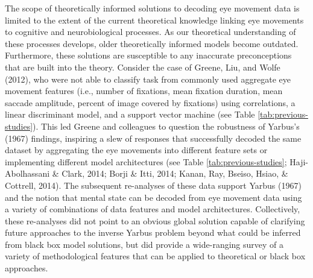 \documentclass[
  english,
  man, donotrepeattitle,floatsintext]{apa6}
\begin{document}
The scope of theoretically informed solutions to decoding eye movement data is limited to the extent of the current theoretical knowledge linking eye movements to cognitive and neurobiological processes. As our theoretical understanding of these processes develops, older theoretically informed models become outdated. Furthermore, these solutions are susceptible to any inaccurate preconceptions that are built into the theory. Consider the case of Greene, Liu, and Wolfe (2012), who were not able to classify task from commonly used aggregate eye movement features (i.e., number of fixations, mean fixation duration, mean saccade amplitude, percent of image covered by fixations) using correlations, a linear discriminant model, and a support vector machine (see Table \ref{tab:previous-studies}). This led Greene and colleagues to question the robustness of Yarbus's (1967) findings, inspiring a slew of responses that successfully decoded the same dataset by aggregating the eye movements into different feature sets or implementing different model architectures (see Table \ref{tab:previous-studies}; Haji-Abolhassani \& Clark, 2014; Borji \& Itti, 2014; Kanan, Ray, Bseiso, Hsiao, \& Cottrell, 2014). The subsequent re-analyses of these data support Yarbus (1967) and the notion that mental state can be decoded from eye movement data using a variety of combinations of data features and model architectures. Collectively, these re-analyses did not point to an obvious global solution capable of clarifying future approaches to the inverse Yarbus problem beyond what could be inferred from black box model solutions, but did provide a wide-ranging survey of a variety of methodological features that can be applied to theoretical or black box approaches.
\end{document}
